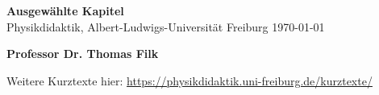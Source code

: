 \documentclass{article}
\begin{document}
\begin{titlepage}
   \begin{center}
       \vspace*{-1cm}
	\Huge
       \textbf{Ausgewählte Kapitel} \\
       \vspace*{1cm}
    \Large{Physikdidaktik, Albert-Ludwigs-Universität Freiburg}
    \vspace*{1cm}
	\normalsize
       \vspace{0.5cm}
       \today
            
       \vspace{1.5cm}

       \textbf{Professor Dr. Thomas Filk}

       \vfill
            
            
       \vspace{0.8cm}
     
            
       Weitere Kurztexte hier: \url{https://physikdidaktik.uni-freiburg.de/kurztexte/}
            
   \end{center}
\end{titlepage}


\end{document}
